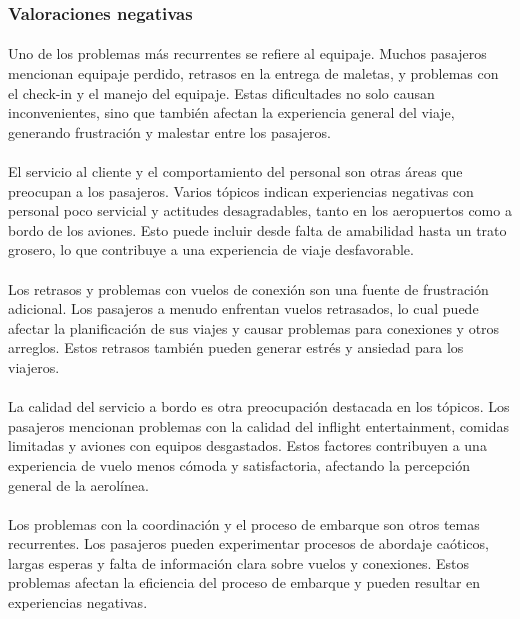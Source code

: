 \documentclass{report}
\begin{document}
                \subsubsection*{Valoraciones negativas}
                    \paragraph*{}{
                        Uno de los problemas más recurrentes se refiere al equipaje. Muchos pasajeros mencionan equipaje perdido, retrasos en la entrega de maletas, y problemas con el check-in y el manejo del equipaje. Estas dificultades no solo causan inconvenientes, sino que también afectan la experiencia general del viaje, generando frustración y malestar entre los pasajeros.
                    }
                    \paragraph*{}{
                        El servicio al cliente y el comportamiento del personal son otras áreas que preocupan a los pasajeros. Varios tópicos indican experiencias negativas con personal poco servicial y actitudes desagradables, tanto en los aeropuertos como a bordo de los aviones. Esto puede incluir desde falta de amabilidad hasta un trato grosero, lo que contribuye a una experiencia de viaje desfavorable.
                    }
                    \paragraph*{}{
                        Los retrasos y problemas con vuelos de conexión son una fuente de frustración adicional. Los pasajeros a menudo enfrentan vuelos retrasados, lo cual puede afectar la planificación de sus viajes y causar problemas para conexiones y otros arreglos. Estos retrasos también pueden generar estrés y ansiedad para los viajeros.
                    }
                    \paragraph*{}{
                        La calidad del servicio a bordo es otra preocupación destacada en los tópicos. Los pasajeros mencionan problemas con la calidad del inflight entertainment, comidas limitadas y aviones con equipos desgastados. Estos factores contribuyen a una experiencia de vuelo menos cómoda y satisfactoria, afectando la percepción general de la aerolínea.
                    }
                    \paragraph*{}{
                        Los problemas con la coordinación y el proceso de embarque son otros temas recurrentes. Los pasajeros pueden experimentar procesos de abordaje caóticos, largas esperas y falta de información clara sobre vuelos y conexiones. Estos problemas afectan la eficiencia del proceso de embarque y pueden resultar en experiencias negativas.
                    }
\end{document}
